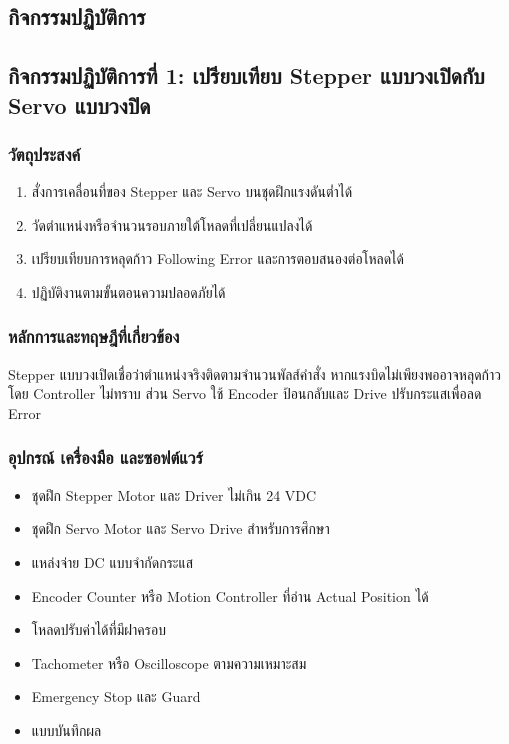 \subsection{กิจกรรมปฏิบัติการ}

\subsection{กิจกรรมปฏิบัติการที่ 1: เปรียบเทียบ Stepper แบบวงเปิดกับ Servo แบบวงปิด}

\subsubsection{วัตถุประสงค์}

\begin{enumerate}
    \item สั่งการเคลื่อนที่ของ Stepper และ Servo บนชุดฝึกแรงดันต่ำได้
    \item วัดตำแหน่งหรือจำนวนรอบภายใต้โหลดที่เปลี่ยนแปลงได้
    \item เปรียบเทียบการหลุดก้าว Following Error และการตอบสนองต่อโหลดได้
    \item ปฏิบัติงานตามขั้นตอนความปลอดภัยได้
\end{enumerate}

\subsubsection{หลักการและทฤษฎีที่เกี่ยวข้อง}

Stepper แบบวงเปิดเชื่อว่าตำแหน่งจริงติดตามจำนวนพัลส์คำสั่ง หากแรงบิดไม่เพียงพออาจหลุดก้าวโดย Controller ไม่ทราบ ส่วน Servo ใช้ Encoder ป้อนกลับและ Drive ปรับกระแสเพื่อลด Error

\subsubsection{อุปกรณ์ เครื่องมือ และซอฟต์แวร์}

\begin{itemize}
    \item ชุดฝึก Stepper Motor และ Driver ไม่เกิน 24 VDC
    \item ชุดฝึก Servo Motor และ Servo Drive สำหรับการศึกษา
    \item แหล่งจ่าย DC แบบจำกัดกระแส
    \item Encoder Counter หรือ Motion Controller ที่อ่าน Actual Position ได้
    \item โหลดปรับค่าได้ที่มีฝาครอบ
    \item Tachometer หรือ Oscilloscope ตามความเหมาะสม
    \item Emergency Stop และ Guard
    \item แบบบันทึกผล
\end{itemize}

